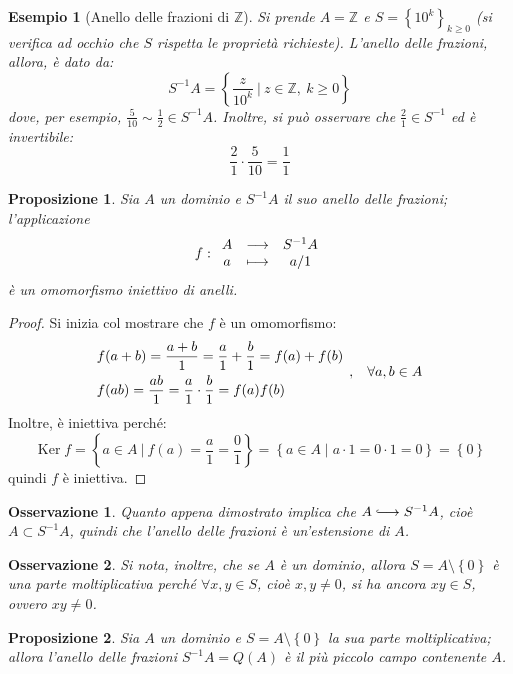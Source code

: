 \documentclass[11pt]{article}
\theoremstyle{style}
\newtheorem{esempio}{Esempio}[section]
\newtheorem{prop}{Proposizione}[section]
\newtheorem{osservazione}{Osservazione}[section]
\numberwithin{equation}{subsection}
\newcommand{\longhookrightarrow}{\lhook\joinrel\longrightarrow}
\begin{document}
\begin{esempio}
	[Anello delle frazioni di $\mathbb{Z}$]
	Si prende $A = \mathbb{Z}$ e $S = \left\{ 10^k \right\} _{k\ge 0} $ (si verifica ad occhio che $S$ rispetta le propriet\`a richieste).
	L'anello delle frazioni, allora, \`e dato da:
	\[
	S^{-1} A = \left\{ \frac{z}{10^k} \ \Big\lvert \ z \in \mathbb{Z}, \ k\ge 0 \right\} 
	\] 
	dove, per esempio, $\displaystyle \frac{5}{10}\sim \frac{1}{2} \in S^{-1}A$.
	Inoltre, si pu\`o osservare che $\displaystyle \frac{2}{1} \in S^{-1}$ ed \`e invertibile:
	\[
	\frac{2}{1}\cdot \frac{5}{10} = \frac{1}{1}
	\] 
\end{esempio}
\begin{prop}\label{aext}
	Sia $A$ un dominio e $S ^{-1}A$ il suo anello delle frazioni; l'applicazione
	\[
f : 
		\begin{array}
			{c c c}
			A &\longrightarrow& S^{-1}A\\
			a &\longmapsto & a / 1
		\end{array}
	\] 
	\`e un omomorfismo iniettivo di anelli.
\end{prop}
	\begin{proof}
		Si inizia col mostrare che $f$ \`e un omomorfismo:
		\[
			\begin{split}
				&f(a + b) = \frac{a+b}{1} = \frac{a}{1}+\frac{b}{1} = f(a) + f(b) \\
				&f(ab)  = \frac{ab}{1} = \frac{a}{1} \cdot \frac{b}{1} = f(a) f(b)
			\end{split} \hspace{.15cm} , \hspace{.3cm} \forall a,b \in A
		\] 
	Inoltre, \`e iniettiva perch\'e:
	\[
	\operatorname{Ker} f = \left\{ a \in  A \ \Big\lvert \ f(a) = \frac{a}{1} = \frac{0}{1} \right\} = \left\{ a \in A  \mid a \cdot 1 = 0\cdot 1 = 0 \right\} = \left\{ 0 \right\} 
	\] 
	quindi $f$ \`e iniettiva.
	\end{proof}
\begin{osservazione}
Quanto appena dimostrato implica che $A \longhookrightarrow  S^{-1}A$, cio\`e $A \subset S^{-1}A$, quindi che l'anello delle frazioni \`e un'estensione di $A$.
\end{osservazione}
\begin{osservazione}
Si nota, inoltre, che se $A$ \`e un dominio, allora $S = A \setminus\left\{ 0 \right\} $ \`e una parte moltiplicativa perch\'e $\forall x,y \in S$, cio\`e $x,y\neq 0$, si ha ancora $xy \in S$, ovvero $xy \neq 0$.
\end{osservazione}
\begin{prop}
	Sia $A$ un dominio e $S = A \setminus\left\{ 0 \right\} $ la sua parte moltiplicativa; allora l'anello delle frazioni $S^{-1}A=Q(A)$ \`e il pi\`u piccolo campo contenente $A$.
\end{prop}
\end{document}
